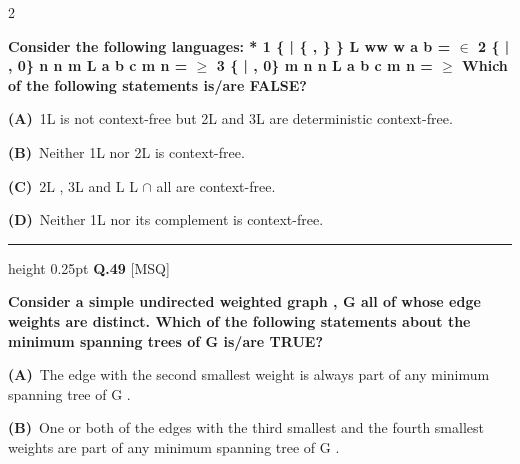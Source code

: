 \documentclass[a4paper,10pt,twoside]{article}
\begin{document}
\begin{multicols}{2}
{\bfseries Consider the following languages:
*
1
\{
|
\{ , \} \}
L
ww w
a b
=
$\in$
2
\{
|
,
0\}
n
n
m
L
a b c
m n
=
$\ge$
3
\{
|
,
0\}
m
n
n
L
a b c
m n
=
$\ge$
Which of the following statements is/are FALSE? \par}
\par\vspace{2pt}\noindent
\textbf{(A)}~1L is not context-free but \newline 2L and \newline 3L are deterministic context-free.\par\vspace{2pt}\noindent
\textbf{(B)}~Neither \newline 1L nor \newline 2L is context-free.\par\vspace{2pt}\noindent
\textbf{(C)}~2L , \newline 3L and   \newline L \newline L \newline $\cap$ \newline all are context-free.\par\vspace{2pt}\noindent
\textbf{(D)}~Neither \newline 1L nor its complement is context-free.
\par\vspace{6pt}\hrule height 0.25pt\vspace{6pt}
\noindent\textbf{Q.49} \hfill {\footnotesize\textsf{[MSQ]}}
\par\vspace{2pt}
{\bfseries Consider a simple undirected weighted graph
,
G all of whose edge weights are
distinct. Which of the following statements about the minimum spanning trees of
G is/are TRUE? \par}
\par\vspace{2pt}\noindent
\textbf{(A)}~The edge with the second smallest weight is always part of any minimum spanning \newline tree of G .\par\vspace{2pt}\noindent
\textbf{(B)}~One or both of the edges with the third smallest and the fourth smallest weights are \newline part of any minimum spanning tree of G .\par\vspace{2pt}\noindent

\end{multicols}
\end{document}
